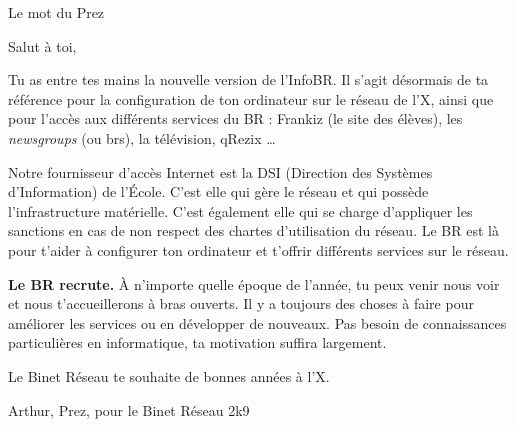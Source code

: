 

\begin{center}
    { \Huge Le mot du Prez }
\end{center}

 Salut \`a toi,

Tu as entre tes mains la nouvelle version de l'InfoBR. Il s'agit d\'esormais de ta r\'ef\'erence pour la configuration de ton ordinateur sur le r\'eseau de l'X, ainsi que pour l'acc\`es aux diff\'erents services du BR : Frankiz (le site des \'el\`eves), les \emph{newsgroups} (ou brs), la t\'el\'evision, qRezix \dots
{}

Notre fournisseur d'acc\`es Internet est la DSI (Direction des Syst\`emes d'Information) de l'\'Ecole. C'est elle qui g\`ere le r\'eseau et qui poss\`ede l'infrastructure mat\'erielle. C'est \'egalement elle qui se charge d'appliquer les sanctions en cas de non respect des chartes d'utilisation du r\'eseau. Le BR est l\`a pour t'aider \`a configurer ton ordinateur et t'offrir diff\'erents services sur le r\'eseau.

\textbf{Le BR recrute.} \`A n'importe quelle \'epoque de l'ann\'ee, tu peux venir nous voir et nous t'accueillerons \`a bras ouverts. Il y a toujours des choses \`a faire pour am\'eliorer les services ou en d\'evelopper de nouveaux. Pas besoin de connaissances particuli\`eres en informatique, ta motivation suffira largement.

Le Binet R\'eseau te souhaite de bonnes ann\'ees \`a l'X.\\

\begin{flushright}
    Arthur, Prez, pour le Binet R\'eseau 2k9 
\end{flushright}

